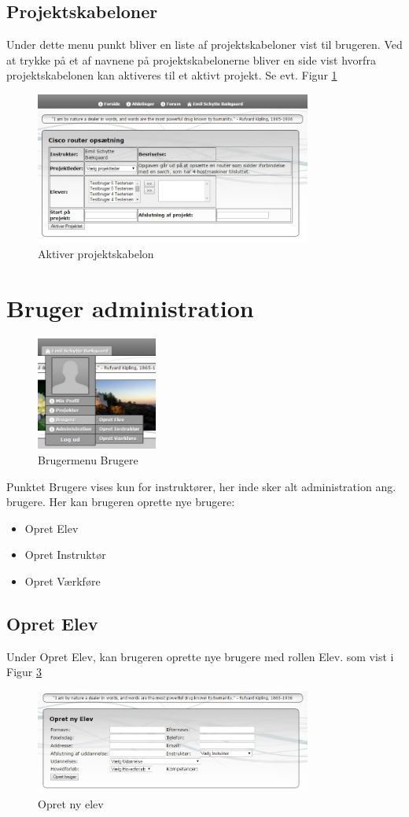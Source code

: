 \documentclass{article}
\begin{document}
\subsection*{Projektskabeloner}
Under dette menu punkt bliver en liste af projektskabeloner vist til brugeren. Ved at trykke på et af navnene på projektskabelonerne bliver en side vist hvorfra projektskabelonen kan aktiveres til et aktivt projekt. Se evt. Figur \ref{fig:6}
\begin{figure}[ht]
\includegraphics[width=343px]{aktiveverProjekt.jpg}
\caption{Aktiver projektskabelon}
\label{fig:6}
\end{figure}
\newpage
\section{Bruger administration}
\begin{figure}[ht]
\includegraphics[width=150px]{brugerpunkt.jpg}
\caption{Brugermenu Brugere}
\label{fig:7}
\end{figure}

Punktet Brugere vises kun for instruktører, her inde sker alt administration ang. brugere. Her kan brugeren oprette nye brugere:
\begin{itemize}
\item Opret Elev
\item Opret Instruktør
\item Opret Værkføre
\end{itemize}
\subsection*{Opret Elev}
Under Opret Elev, kan brugeren oprette nye brugere med rollen Elev. som vist i Figur \ref{fig:8}
\begin{figure}[ht]
\includegraphics[width=343px]{opretelev.jpg}
\caption{Opret ny elev}
\label{fig:8}
\end{figure}
\newpage
\end{document}
